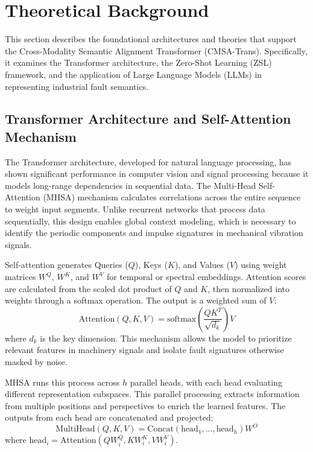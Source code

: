 \documentclass[journal]{IEEEtran}
\begin{document}
\section{Theoretical Background}
\label{sec:background}
This section describes the foundational architectures and theories that support the Cross-Modality Semantic Alignment Transformer (CMSA-Trans). Specifically, it examines the Transformer architecture, the Zero-Shot Learning (ZSL) framework, and the application of Large Language Models (LLMs) in representing industrial fault semantics.

\subsection{Transformer Architecture and Self-Attention Mechanism}
The Transformer architecture, developed for natural language processing, has shown significant performance in computer vision and signal processing because it models long-range dependencies in sequential data. The Multi-Head Self-Attention (MHSA) mechanism calculates correlations across the entire sequence to weight input segments. Unlike recurrent networks that process data sequentially, this design enables global context modeling, which is necessary to identify the periodic components and impulse signatures in mechanical vibration signals.

Self-attention generates Queries ($Q$), Keys ($K$), and Values ($V$) using weight matrices $W^Q$, $W^K$, and $W^V$ for temporal or spectral embeddings. Attention scores are calculated from the scaled dot product of $Q$ and $K$, then normalized into weights through a softmax operation. The output is a weighted sum of $V$:
\begin{equation}
\text{Attention}(Q, K, V) = \text{softmax}\left(\frac{QK^T}{\sqrt{d_k}}\right)V
\end{equation}
where $d_k$ is the key dimension. This mechanism allows the model to prioritize relevant features in machinery signals and isolate fault signatures otherwise masked by noise.

MHSA runs this process across $h$ parallel heads, with each head evaluating different representation subspaces. This parallel processing extracts information from multiple positions and perspectives to enrich the learned features. The outputs from each head are concatenated and projected:
\begin{equation}
\text{MultiHead}(Q, K, V) = \text{Concat}(\text{head}_1, \dots, \text{head}_h)W^O
\end{equation}
where $\text{head}_i = \text{Attention}(QW_i^Q, KW_i^K, VW_i^V)$.
\end{document}

